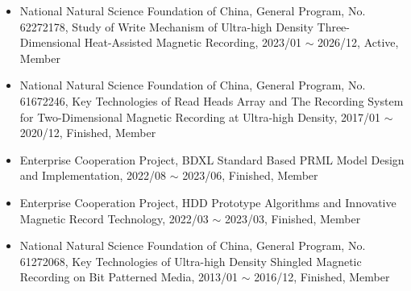 \documentclass{resume}
\begin{document}

\begin{itemize}
  \item National Natural Science Foundation of China, General Program, No. 62272178, Study of Write Mechanism of Ultra-high Density Three-Dimensional
  Heat-Assisted Magnetic Recording, 2023/01 $\sim$ 2026/12, Active, Member
  \item National Natural Science Foundation of China, General Program, No. 61672246, Key Technologies of Read Heads Array and The Recording System for
  Two-Dimensional Magnetic Recording at Ultra-high Density, 2017/01 $\sim$ 2020/12, Finished, Member
  \item Enterprise Cooperation Project, BDXL Standard Based PRML Model Design and Implementation, 2022/08 $\sim$ 2023/06, Finished, Member
  \item Enterprise Cooperation Project, HDD Prototype Algorithms and Innovative Magnetic Record Technology, 2022/03 $\sim$ 2023/03, Finished, Member 
  \item National Natural Science Foundation of China, General Program, No. 61272068, Key Technologies of Ultra-high Density Shingled Magnetic Recording on Bit Patterned Media, 2013/01 $\sim$ 2016/12, Finished, Member
\end{itemize}
\end{document}
